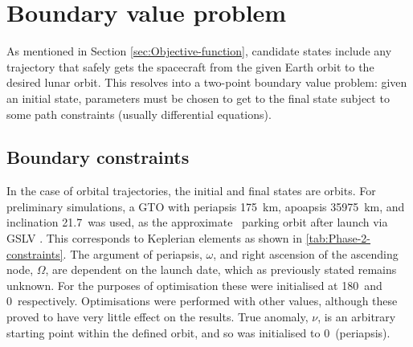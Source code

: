 



\section{Boundary value problem} \label{sec:BVP}

As mentioned in Section \ref{sec:Objective-function}, candidate states include any trajectory that safely gets the spacecraft from the given Earth orbit to the desired lunar orbit. This resolves into a two-point boundary value problem: given an initial state, parameters must be chosen to get to the final state subject to some path constraints (usually differential equations).


\subsection{Boundary constraints} \label{sub:Boundary-constraints}

In the case of orbital trajectories, the initial and final states are orbits. For preliminary simulations, a GTO with periapsis 175~km, apoapsis 35975~km, and inclination 21.7\degrees\ was used, as the approximate \BW\ parking orbit after launch via GSLV \parencite{GSLV}. This corresponds to Keplerian elements as shown in \autoref{tab:Phase-2-constraints}. The argument of periapsis, $\omega$, and right ascension of the ascending node, $\Omega$, are dependent on the launch date, which as previously stated remains unknown. For the purposes of optimisation these were initialised at 180\degrees\ and 0\degrees\ respectively. Optimisations were performed with other values, although these proved to have very little effect on the results. True anomaly, $\nu$, is an arbitrary starting point within the defined orbit, and so was initialised to 0\degrees\ (periapsis).

